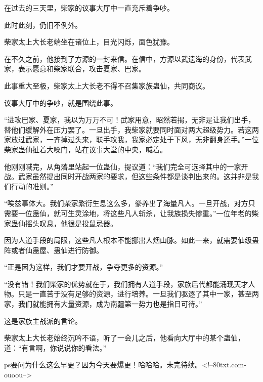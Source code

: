 \begin{this_body}
在过去的三天里，柴家的议事大厅中一直充斥着争吵。

此时此刻，仍旧不例外。

柴家太上大长老端坐在诸位上，目光闪烁，面色犹豫。

在不久之前，他接到了方源的一封来信。在信中，方源以武遗海的身份，代表武家，表示愿意和柴家联合，攻击夏家、巴家。

此事重大至极，柴家太上大长老不得不召集家族蛊仙，共同商议。

议事大厅中的争吵，就是围绕此事。

“进攻巴家、夏家，我以为万万不可！武家用意，昭然若揭，无非是让我们出手，替他们缓解外在压力罢了。一旦出手，我柴家就要同时面对两大超级势力。若这两家放过武家，一齐掉过头来，联手攻我，我家必定处于下风，无非翻身还手。”一位柴家蛊仙扯着大嗓门，站在议事大堂的中央，喊着。

他刚刚喊完，从角落里站起一位蛊仙，提议道：“我们完全可选择其中的一家开战。武家虽然提出同时开战两家的要求，但这些条件都是谈判出来的。这并非是我们行动的准则。”

“唉兹事体大。我们柴家繁衍生息这么多，豢养出了海量凡人。一旦开战，对方只需要一位蛊仙，就可生灵涂地，将这些凡人斩杀，让我族损失惨重。”一位年老的柴家蛊仙摇头叹息，他很是投鼠忌器。

因为人道手段的局限，这些凡人根本不能挪出人烟山脉。如此一来，就需要仙级蛊阵或者仙蛊屋、蛊仙进行防御。

“正是因为这样，我们才要开战，争夺更多的资源。”

“没有错！我们柴家的优势就在于，我们拥有人道手段，家族后代都能涌现天才人物。只是一直苦于没有足够的资源，进行培养。一旦我们驱逐了其中一家，甚至两家，我们就能拥有大量资源，成为南疆第一势力也是指日可待。”

这是家族主战派的言论。

柴家太上大长老始终沉吟不语，听了一会儿之后，他看向大厅中的某个蛊仙，道：“有言啊，你说说你的看法。”

ps要问为什么这么早更？因为今天要爆更！哈哈哈。未完待续。<!--80txt.com-ouoou-->

\end{this_body}

